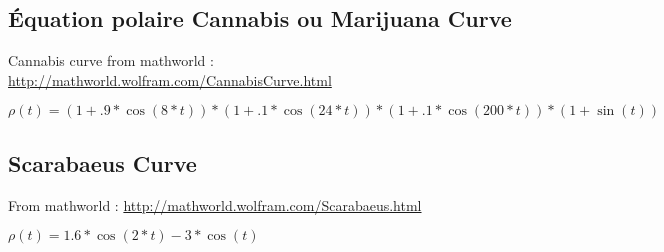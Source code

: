    \newpage
\subsection{Équation polaire Cannabis ou Marijuana Curve}
 Cannabis curve from mathworld : \url{http://mathworld.wolfram.com/CannabisCurve.html}

$ \rho(t)=(1+.9*\cos(8*t))*(1+.1*\cos(24*t))*(1+.1*\cos(200*t))*(1+\sin(t)) $

\begin{center}
\begin{tkzexample}[vbox]
\end{tkzexample}
\end{center}


\newpage
\subsection{Scarabaeus  Curve}
From mathworld : \url{http://mathworld.wolfram.com/Scarabaeus.html}

$\rho(t)=1.6*\cos(2*t)-3*\cos(t) $

\vspace{2cm}
\begin{center}
\begin{tkzexample}[]
	\end{tkzexample}
\end{center}


\endinput


